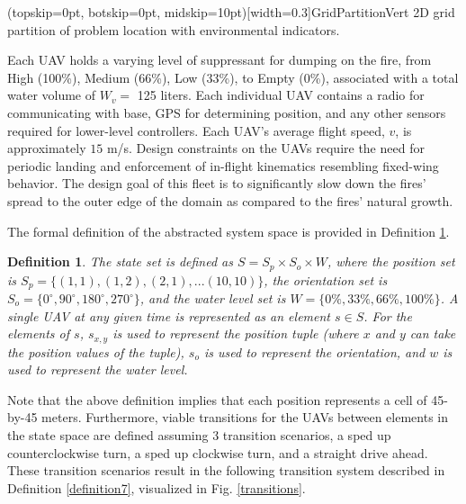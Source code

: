 \documentclass{ieeeaccess}
\newtheorem{definition}{Definition}
\begin{document}
\Figure[t!](topskip=0pt, botskip=0pt, midskip=10pt)[width=0.3\textwidth]{GridPartitionVert}
{2D grid partition of problem location with environmental indicators.\label{probpartition}}

Each UAV holds a varying level of suppressant for dumping on the fire, from High (100\%), Medium (66\%), Low (33\%), to Empty (0\%), associated with a total water volume of $W_v = $ 125 liters. Each individual UAV contains a radio for communicating with base, GPS for determining position, and any other sensors required for lower-level controllers. Each UAV's average flight speed, $v$, is approximately $15$ m/s. Design constraints on the UAVs require the need for periodic landing and enforcement of in-flight kinematics resembling fixed-wing behavior. The design goal of this fleet is to significantly slow down the fires' spread to the outer edge of the domain as compared to the fires' natural growth.

The formal definition of the abstracted system space is provided in Definition \ref{system}.

\begin{definition}
	\label{system}
	The state set is defined as $S = S_p \times S_o \times W$, where the position set is $S_p = \{(1, 1), (1, 2), (2, 1),... (10, 10)\}$, the orientation set is $S_o = \{0^\circ, 90^\circ, 180^\circ, 270^\circ\}$, and the water level set is $W= \{0\%,33\%, 66\%, 100\%\}$. A single UAV at any given time is represented as an element $s \in S$. For the elements of $s$, $s_{x,y}$ is used to represent the position tuple (where $x$ and $y$ can take the position values of the tuple), $s_o$ is used to represent the orientation, and $w$ is used to represent the water level.
\end{definition}

Note that the above definition implies that each position represents a cell of 45-by-45 meters. Furthermore, viable transitions for the UAVs between elements in the state space are defined assuming 3 transition scenarios, a sped up counterclockwise turn, a sped up clockwise turn, and a straight drive ahead. These transition scenarios result in the following transition system described in Definition \ref{definition7}, visualized in Fig. \ref{transitions}.
\end{document}
